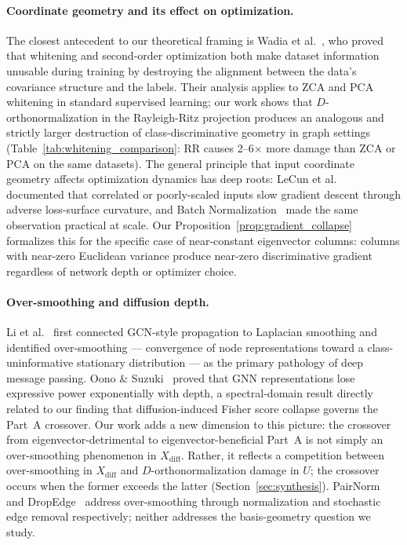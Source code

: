 \documentclass[11pt]{article}
\begin{document}
\paragraph{Coordinate geometry and its effect on optimization.}
The closest antecedent to our theoretical framing is
Wadia et al.~\citep{wadia2021whitening}, who proved that whitening and
second-order optimization both make dataset information unusable during training
by destroying the alignment between the data's covariance structure and the
labels.
Their analysis applies to ZCA and PCA whitening in standard supervised learning;
our work shows that $D$-orthonormalization in the Rayleigh-Ritz projection
produces an analogous and strictly larger destruction of class-discriminative
geometry in graph settings (Table~\ref{tab:whitening_comparison}: RR causes
2--6$\times$ more damage than ZCA or PCA on the same datasets).
The general principle that input coordinate geometry affects optimization
dynamics has deep roots: LeCun et al.~\citep{lecun2012efficientbackprop}
documented that correlated or poorly-scaled inputs slow gradient descent
through adverse loss-surface curvature, and Batch
Normalization~\citep{ioffe2015batchnorm} made the same observation practical
at scale.
Our Proposition~\ref{prop:gradient_collapse} formalizes this for the specific
case of near-constant eigenvector columns: columns with near-zero Euclidean
variance produce near-zero discriminative gradient regardless of network depth
or optimizer choice.

\paragraph{Over-smoothing and diffusion depth.}
Li et al.~\citep{li2018deeperinsights} first connected GCN-style propagation
to Laplacian smoothing and identified over-smoothing — convergence of node
representations toward a class-uninformative stationary distribution — as the
primary pathology of deep message passing.
Oono \& Suzuki~\citep{oono2020exponentially} proved that GNN representations
lose expressive power exponentially with depth, a spectral-domain result
directly related to our finding that diffusion-induced Fisher score collapse
governs the Part~A crossover.
Our work adds a new dimension to this picture: the crossover from
eigenvector-detrimental to eigenvector-beneficial Part~A is not simply an
over-smoothing phenomenon in $X_{\mathrm{diff}}$.
Rather, it reflects a competition between over-smoothing in $X_{\mathrm{diff}}$
and $D$-orthonormalization damage in $U$; the crossover occurs when
the former exceeds the latter (Section~\ref{sec:synthesis}).
PairNorm~\citep{zhao2020pairnorm} and DropEdge~\citep{rong2020dropedge}
address over-smoothing through normalization and stochastic edge removal
respectively; neither addresses the basis-geometry question we study.
\end{document}
